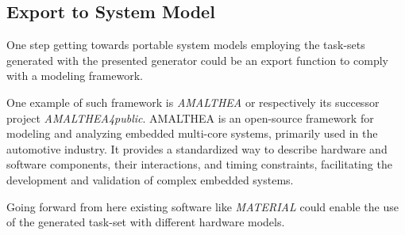 \subsection{Export to System Model}\label{subsec:future_work:export_to_amalthea}
One step getting towards portable system models employing the task-sets generated with the presented generator could be an export function to comply with a modeling framework.

One example of such framework is \textit{AMALTHEA}\cite{itea2officeAMALTHEAProjectResults2015} or respectively its successor project \textit{AMALTHEA4public}\cite{johan.van.der.heide[at]itea4.orgITEA4Project}.
AMALTHEA is an open-source framework for modeling and analyzing embedded multi-core systems, primarily used in the automotive industry. 
It provides a standardized way to describe hardware and software components, their interactions, and timing constraints, facilitating the development and validation of complex embedded systems.

Going forward from here existing software like \textit{MATERIAL}\cite{beckerMATERIALFrameworkModeling2024} could enable the use of the generated task-set with different hardware models.

